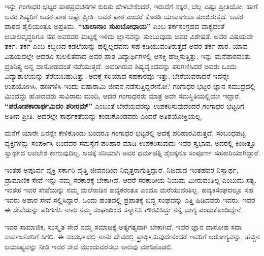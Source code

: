 {ಇನ್ನು ಗಂಗಾಧರ ಭಟ್ಟರ ಪಾಠಪ್ರವಚನಗಳ ಕುರಿತು ಹೇಳಬೇಕೆಂದರೆ, ಇರುವೆಗೆ ಸಕ್ಕರೆ, ಬೆಲ್ಲ ಎಷ್ಟು ಪ್ರೀತಿಯೋ, ಹಾಗೆ ಅವರ ಶಿಷ್ಯರಿಗೆ ಅವರ ಪಾಠ ಅಷ್ಟೇ ಪ್ರೀತಿ. ಅವರ ಪಾಠ ಎಂದರೆ ಕೊಠಡಿ ಯಾವಾಗಲೂ ತುಂಬಿರುತ್ತದೆ. ಅವರ ಪಾಠದ ಶೈಲಿಯಂತೂ ಅಪ್ರತಿಮ. \textbf{“ಬಾಲಾನಾಂ ಸುಖಬೋಧಾಯ”} ಎಂಬ ತರ್ಕಸಂಗ್ರಹದ ವಾಕ್ಯದಂತೆ ಆಬಾಲವೃದ್ಧರಿಗೂ ಸಹ ಅವರವರ ಮಟ್ಟಕ್ಕೆ ಇಳಿದು ಜ್ಞಾನವನ್ನು ತುಂಬುವುದು ಅವರ ವಿಶೇಷತೆ. ಅವರ ವಿಷಯವೇ ತರ್ಕ. ತರ್ಕ ಎಂಬ ಕಬ್ಬಿಣದ ಕಡಲೆಯನ್ನು ಹಲ್ಲಿಲ್ಲದವನು ಸಹ ಕಡಿಯುವಂತಿರುತ್ತದೆ ಅವರ ತರ್ಕ ಪಾಠ. ಯಾವ ವಿಷಯದಲ್ಲೇ ಆದರೂ ಸುಲಲಿತವಾದ ಅವರ ಪಾಠ ವಿದ್ಯಾರ್ಥಿಗಳಲ್ಲಿ ಆಸಕ್ತಿ ಹೆಚ್ಚಿಸುತ್ತಿತ್ತು. ಇನ್ನು ಮನೆ\-ಪಾಠವಂತು ಪ್ರತಿನಿತ್ಯ ಅನ್ನ ದಾಸೋಹದಂತೆ ನಡೆಯುತ್ತದೆ. ಅವರಿಗಿರುವ ಶಿಷ್ಯವೃಂದವನ್ನು ಪರಿಗಣಿಸಿದರೆ ಅವರು ಒಂದು ವಿದ್ಯಾಶಾಲೆಯನ್ನು ತೆರೆಯಬಹುದಿತ್ತು. ಅದಕ್ಕೆ ಸರಿಯಾದ ಸಹಕಾರವೂ ಇತ್ತು. ಬೇರೆಯವರಾದರೆ ಇದನ್ನೇ ಉಪಯೋಗಿಸಿ, ಹಣಗಳಿಸಿ ಇಂದು ಐಷಾರಾಮಿ ಜೀವನ ನಡೆಸುತ್ತಿದ್ದರೇನೋ? ಗಂಗಾಧರ ಭಟ್ಟರ ಜ್ಞಾನ ಸಮುದ್ರದಲ್ಲಿ ಮಿಂದೆದ್ದು ಹೋದವರು ಸಾವಿರಾರು ಮಂದಿ, ಆದರೆ ಗಂಗಾಧರರು ಮಾತ್ರ ಅದೇ ಸಮಸ್ಥಿತಿಯಲ್ಲಿಯೇ ಇದ್ದಾರೆ. \textbf{“ಪರೋಪಕಾರಾರ್ಥಮಿದಂ ಶರೀರಮ್”} ಎಂಬಂತೆ ಬೇರೆಯವರನ್ನು ಉಪಕರಿಸುವುದೆಂದರೆ ಗಂಗಾಧರ ಭಟ್ಟರಿಗೆ ಅತೀವ ಪ್ರೀತಿ. ಅದರಲ್ಲೇ ಸಾರ್ಥಕತೆಯನ್ನು ಕಂಡುಕೊಂಡವರು ಎಂದರೆ ಅತಿಶಯೋಕ್ತಿಯಲ್ಲ.

ಮನೆಗೆ ಯಾರೇ ಏನನ್ನೇ ಕೇಳಿಕೊಂಡು ಬಂದರೂ ಗಂಗಾಧರ ಭಟ್ಟರಲ್ಲಿ ಅದಕ್ಕೆ ಪರಿಹಾರವಿರುತ್ತದೆ. ಸಂಬಂಧಪಟ್ಟ ವ್ಯಕ್ತಿಗಳನ್ನು ಸಂಪರ್ಕಿಸಿ ಬಂದವರ ಸಮಸ್ಯೆಗೆ ಪರಿಹಾರ ಮಾಡಿ ಉಪಕರಿಸುವುದು ಇವರ ಸ್ವಭಾವ. ಅದರಲ್ಲಿ ಕಿಂಚಿತ್ತೂ ಸ್ವಾರ್ಥದ ಲವಲೇಶ ಕಾಣುವುದಿಲ್ಲ. ಅದಕ್ಕೆ ಸರಿಯಾಗಿ ಅವರ ಧರ್ಮಪತ್ನಿ ಶೈಲಕ್ಕನೂ ಸಂಪೂರ್ಣ ಸಹ\-ಕಾರಿಯಾಗಿದ್ದಾರೆ.

ಇಂತಹ ಅಪೂರ್ವ ವ್ಯಕ್ತಿ ಸರ್ಕಾರಿ ವೃತ್ತಿ ಜೀವನದಿಂದ ನಿವೃತ್ತರಾಗುತ್ತಿದ್ದಾರೆ. ನಿಜವಾದ ಇಂತಹವರ ನಿಸ್ವಾರ್ಥ, ಪ್ರಾಮಾಣಿಕ ಸೇವೆ ಇನ್ನು ನಮ್ಮ ಸರಕಾರಕ್ಕೆ ಬೇಕಾಗಿದೆ. ಆದರೆ ಸರಕಾರೀಯ ನಿಯಮ ಮೀರುವಂತಿಲ್ಲ ಎಂಬುದು ಸತ್ಯ. ಇಂತಹ ಇವರ ಸೇವೆಯನ್ನು ನಮ್ಮ ಮಲೆನಾಡಿನ ಹವ್ಯಕರಂತೂ ಎಂದೂ ಮರೆಯುವಂತಿಲ್ಲ. ಹವ್ಯಕಸಂಘದಲ್ಲೂ ಸಹ ಇವರು ಅಪಾರ ಸೇವೆ ಸಲ್ಲಿಸಿದ್ದಾರೆ. ಒಂದು ಹಂತದಲ್ಲಿ ಪ್ರಪಾತಕ್ಕೆ ಬಿದ್ದ ಸಂಘವನ್ನು ಎತ್ತಿ ಹಿಡಿದವರು ಇವರು. ಇವರ ಈ ಸೇವೆಯನ್ನು ಪರಿಗಣಿಸಿ ನಾನು ನಮ್ಮ ಸಂಘಂದಿಂದ ಸನ್ಮಾನಿಸಿ ಗೌರವಿಸಿದ್ದು ನನ್ನ ಭಾಗ್ಯ ಎಂದುಕೊಂಡಿದ್ದೇನೆ.

ಇವರ ಸಾಮಾಜಿಕ, ಸಂಸ್ಕೃತ ಸೇವೆ ನಮ್ಮ ಸಮಾಜಕ್ಕೆ ಅತ್ಯಗತ್ಯವಾಗಿ ಬೇಕಾಗಿದೆ. ಇವರ ಜ್ಞಾನ ದಾಸೋಹ ಸದಾ ಸಾರ್ವಜನಿಕರಿಗೆ ಸಿಗಲಿ. ಈ ಸಂದರ್ಭದಲ್ಲಿ ನಾನು ದೇವರಲ್ಲಿ ಪ್ರಾರ್ಥಿಸುವುದೇನೆಂದರೆ ಇವರಿಗೆ ಆರೋಗ್ಯವನ್ನು, ಹೆಚ್ಚಿನ ಆಯುಷ್ಯವನ್ನು ನೀಡಿ ಇವರ ಸೇವೆ ಮುಂದುವರೆಸಲು ಅನುವು ಮಾಡಿಕೊಡಲಿ.

\articleend
}
